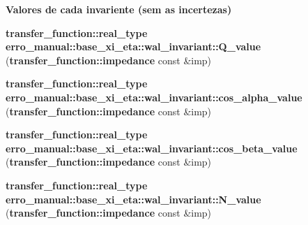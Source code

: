 \begin{Indent}{\bf Valores de cada invariente (sem as incertezas)}
\begin{CompactItemize}
\item 
{\bf transfer\_\-function::real\_\-type} \textbf{erro\_\-manual::base\_\-xi\_\-eta::wal\_\-invariant::Q\_\-value} ({\bf transfer\_\-function::impedance} const \&imp)\label{namespaceerro__manual_1_1base__xi__eta_1_1wal__invariant_3650c74f743142b3e11e4d51fd4847de}

\item 
{\bf transfer\_\-function::real\_\-type} \textbf{erro\_\-manual::base\_\-xi\_\-eta::wal\_\-invariant::cos\_\-alpha\_\-value} ({\bf transfer\_\-function::impedance} const \&imp)\label{namespaceerro__manual_1_1base__xi__eta_1_1wal__invariant_88a1270f8c9002a97427c4965b3a3082}

\item 
{\bf transfer\_\-function::real\_\-type} \textbf{erro\_\-manual::base\_\-xi\_\-eta::wal\_\-invariant::cos\_\-beta\_\-value} ({\bf transfer\_\-function::impedance} const \&imp)\label{namespaceerro__manual_1_1base__xi__eta_1_1wal__invariant_55b72a2e94bc4f928c45b8e21ea0f70b}

\item 
{\bf transfer\_\-function::real\_\-type} \textbf{erro\_\-manual::base\_\-xi\_\-eta::wal\_\-invariant::N\_\-value} ({\bf transfer\_\-function::impedance} const \&imp)\label{namespaceerro__manual_1_1base__xi__eta_1_1wal__invariant_2e97fad7431d24fbb9408bf74476fb7a}

\end{CompactItemize}
\end{Indent}
